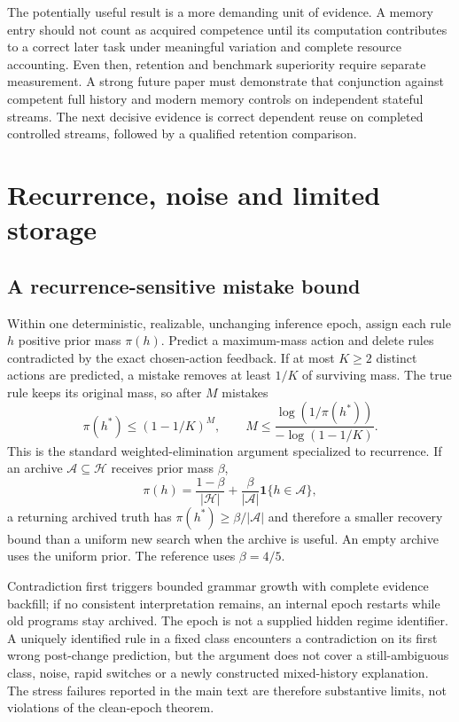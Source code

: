 \documentclass[10pt,twocolumn]{article}
\newcommand{\ind}{\mathbf{1}}
\begin{document}
The potentially useful result is a more demanding unit of evidence. A memory
entry should not count as acquired competence until its computation contributes
to a correct later task under meaningful variation and complete resource
accounting. Even then, retention and benchmark superiority require separate
measurement. A strong future paper must demonstrate that conjunction against
competent full history and modern memory controls on independent stateful
streams. The next decisive evidence is correct dependent reuse on completed controlled
streams, followed by a qualified retention comparison.

\appendix
\section{Recurrence, noise and limited storage}\label{app:recurrence}
\subsection{A recurrence-sensitive mistake bound}
Within one deterministic, realizable, unchanging inference epoch, assign each
rule $h$ positive prior mass $\pi(h)$. Predict a maximum-mass action and delete
rules contradicted by the exact chosen-action feedback. If at most $K\geq2$
distinct actions are predicted, a mistake removes at least $1/K$ of surviving
mass. The true rule keeps its original mass, so after $M$ mistakes
\begin{equation}
 \pi(h^*)\leq(1-1/K)^M,\qquad
 M\leq\frac{\log(1/\pi(h^*))}{-\log(1-1/K)}.
\end{equation}
This is the standard weighted-elimination argument specialized to recurrence.
If an archive $\mathcal A\subseteq\mathcal H$ receives prior mass $\beta$,
\begin{equation}
 \pi(h)=\frac{1-\beta}{|\mathcal H|}
       +\frac{\beta}{|\mathcal A|}\ind\{h\in\mathcal A\},
\end{equation}
a returning archived truth has $\pi(h^*)\geq\beta/|\mathcal A|$ and therefore a
smaller recovery bound than a uniform new search when the archive is useful.
An empty archive uses the uniform prior. The reference uses $\beta=4/5$.

Contradiction first triggers bounded grammar growth with complete evidence
backfill; if no consistent interpretation remains, an internal epoch restarts
while old programs stay archived. The epoch is not a supplied hidden regime
identifier. A uniquely identified rule in a fixed class encounters a
contradiction on its first wrong post-change prediction, but the argument does
not cover a still-ambiguous class, noise, rapid switches or a newly constructed
mixed-history explanation. The stress failures reported in the main text are
therefore substantive limits, not violations of the clean-epoch theorem.
\end{document}
